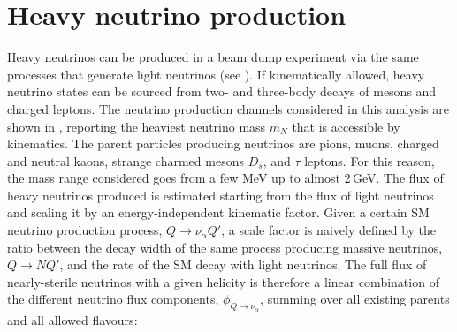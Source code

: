 \section{Heavy neutrino production}
\label{sec:production}


Heavy neutrinos can be produced in a beam dump experiment via the same processes %
that generate light neutrinos (see ).
If kinematically allowed, heavy neutrino states can be sourced from two- and three-body decays of mesons and charged leptons.
The neutrino production channels considered in this analysis are shown in , %
reporting the heaviest neutrino mass $m_N$ that is accessible by kinematics.
The parent particles producing neutrinos are pions, muons, charged and neutral kaons, %
strange charmed mesons $D_s$, and $\tau$ leptons.
For this reason, the mass range considered goes from a few MeV up to almost 2\,GeV.
The flux of heavy neutrinos produced is estimated starting from the flux of light neutrinos %
and scaling it by an energy-independent kinematic factor.
Given a certain SM neutrino production process, $Q \to \nu_\alpha Q'$, %
a scale factor is naively defined by the ratio between the decay width of the same process producing massive neutrinos, %
$Q \to N Q'$, and the rate of the SM decay with light neutrinos.
The full flux of nearly-sterile neutrinos with a given helicity is therefore a linear combination of the different neutrino flux components, %
$\phi_{Q \to\nu_\alpha}$, summing over all existing parents and all allowed flavours:
